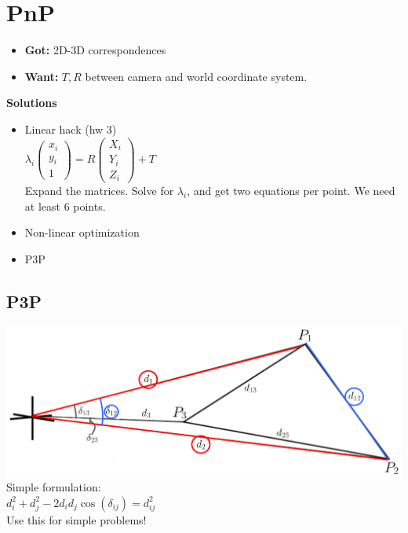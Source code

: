 \section{PnP}
\begin{itemize}
  \item \textbf{Got:} 2D-3D correspondences
  \item \textbf{Want:} $T, R$ between camera and world coordinate
    system.
\end{itemize}

\textbf{Solutions}
\begin{itemize}
  \item Linear hack (hw 3)\\
    $\lambda_i \begin{pmatrix} x_i \\ y_i \\ 1 \end{pmatrix} = R
    \begin{pmatrix}X_i \\ Y_i \\ Z_i \end{pmatrix} + T$\\
    Expand the matrices.
    Solve for $\lambda_i$, and get two equations per point. \alert{We
    need at least 6 points}.
  \item Non-linear optimization
  \item P3P
\end{itemize}

\subsection*{P3P}
\includegraphics[width=\linewidth]{Images/P3P.png}
Simple formulation:\\
$d_i^2 + d_j^2 - 2 d_i d_j \cos(\delta_{ij}) = d_{ij}^2$\\
\alert{Use this for simple problems!}

